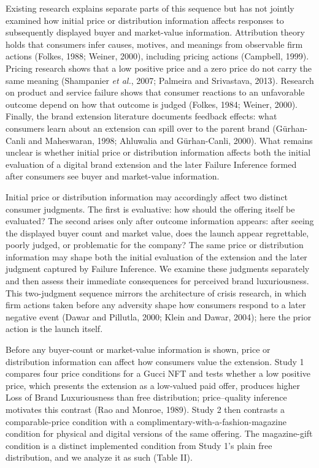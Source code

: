 \documentclass[12pt, a4paper]{article}
\begin{document}
Existing research explains separate parts of this sequence but has not jointly examined how initial price or distribution information affects responses to subsequently displayed buyer and market-value information. Attribution theory holds that consumers infer causes, motives, and meanings from observable firm actions (Folkes, 1988; Weiner, 2000), including pricing actions (Campbell, 1999). Pricing research shows that a low positive price and a zero price do not carry the same meaning (Shampanier \emph{et al.}, 2007; Palmeira and Srivastava, 2013). Research on product and service failure shows that consumer reactions to an unfavorable outcome depend on how that outcome is judged (Folkes, 1984; Weiner, 2000). Finally, the brand extension literature documents feedback effects: what consumers learn about an extension can spill over to the parent brand (G\"urhan-Canli and Maheswaran, 1998; Ahluwalia and G\"urhan-Canli, 2000). What remains unclear is whether initial price or distribution information affects both the initial evaluation of a digital brand extension and the later Failure Inference formed after consumers see buyer and market-value information.

Initial price or distribution information may accordingly affect two distinct consumer judgments. The first is evaluative: how should the offering itself be evaluated? The second arises only after outcome information appears: after seeing the displayed buyer count and market value, does the launch appear regrettable, poorly judged, or problematic for the company? The same price or distribution information may shape both the initial evaluation of the extension and the later judgment captured by Failure Inference. We examine these judgments separately and then assess their immediate consequences for perceived brand luxuriousness. This two-judgment sequence mirrors the architecture of crisis research, in which firm actions taken before any adversity shape how consumers respond to a later negative event (Dawar and Pillutla, 2000; Klein and Dawar, 2004); here the prior action is the launch itself.

Before any buyer-count or market-value information is shown, price or distribution information can affect how consumers value the extension. Study 1 compares four price conditions for a Gucci NFT and tests whether a low positive price, which presents the extension as a low-valued paid offer, produces higher Loss of Brand Luxuriousness than free distribution; price--quality inference motivates this contrast (Rao and Monroe, 1989). Study 2 then contrasts a comparable-price condition with a complimentary-with-a-fashion-magazine condition for physical and digital versions of the same offering. The magazine-gift condition is a distinct implemented condition from Study 1's plain free distribution, and we analyze it as such (Table II).
\end{document}

